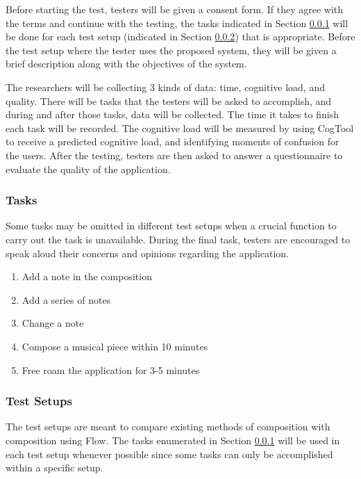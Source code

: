 Before starting the test, testers will be given a consent form. If they agree with the terms and continue with the testing, the tasks indicated in Section \ref{sec:tasks} will be done for each test setup (indicated in Section \ref{sec:test-setups}) that is appropriate. Before the test setup where the tester uses the proposed system, they will be given a brief description along with the objectives of the system. 

The researchers will be collecting 3 kinds of data: time, cognitive load, and quality. There will be tasks that the testers will be asked to accomplish, and during and after those tasks, data will be collected. The time it takes to finish each task will be recorded. The cognitive load will be measured by using CogTool to receive a predicted cognitive load, and identifying moments of confusion for the users. After the testing, testers are then asked to answer a questionnaire to evaluate the quality of the application.

\subsubsection{Tasks}
\label{sec:tasks}

Some tasks may be omitted in different test setups when a crucial function to carry out the task is unavailable. During the final task, testers are encouraged to speak aloud their concerns and opinions regarding the application.

\begin{enumerate}
\item Add a note in the composition
\item Add a series of notes
\item Change a note
\item Compose a musical piece within 10 minutes
\item Free roam the application for 3-5 minutes
\end{enumerate}

\subsubsection{Test Setups}
\label{sec:test-setups}

The test setups are meant to compare existing methods of composition with composition using Flow. The tasks enumerated in Section \ref{sec:tasks} will be used in each test setup whenever possible since some tasks can only be accomplished within a specific setup. 

